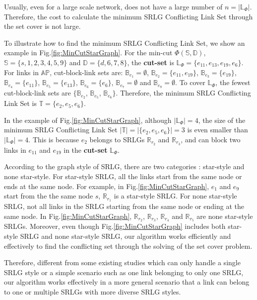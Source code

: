 Usually, even for a large scale network,  does not have a large number of $n=|\mathbb{L}_{\Phi}|$.  Therefore, the cost to calculate the minimum SRLG Conflicting Link Set through the set cover is not large.

To illustrate how to find the minimum SRLG Conflicting Link Set, we show an example in Fig.\ref{fig:MinCutStarGraph}. For the min-cut $\Phi(\mathbb{S},\mathbb{D})$, $\mathbb{S}=\{s, 1, 2, 3, 4, 5, 9\}$ and $\mathbb{D}=\{d, 6, 7, 8\}$, the \textbf{cut-set} is $\mathbb{L}_{\Phi}=\{e_{11},e_{13},e_{19},e_{6}\}$. For links in $\mathbb{AP}$,  cut-block-link sets are: $\mathbb{B}_{e_1}=\emptyset$, $\mathbb{B}_{e_2}=\{e_{11},e_{19}\}$, $\mathbb{B}_{e_3}=\{e_{19}\}$, $\mathbb{B}_{e_4}=\{e_{11}\}$, $\mathbb{B}_{e_5}=\{e_{13}\}$, $\mathbb{B}_{e_6}=\{e_6\}$, $\mathbb{B}_{e_7}=\emptyset$ and $\mathbb{B}_{e_8}=\emptyset$. To cover $\mathbb{L}_{\Phi}$, the fewest cut-block-link sets are $\{\mathbb{B}_{e_2}$, $\mathbb{B}_{e_5}$, $\mathbb{B}_{e_6}\}$. Therefore, the minimum SRLG Conflicting Link Set is $\mathbb{T}=\{e_2, e_5, e_6 \}$.

In the example of Fig.\ref{fig:MinCutStarGraph}, although $|\mathbb{L}_{\Phi}|=4$, the size of  the minimum SRLG Conflicting Link Set $|\mathbb{T}|=|\{e_2, e_5, e_6 \}|=3$ is even smaller than $|\mathbb{L}_{\Phi}|=4$. This is because $e_2$ belongs to   SRLGs $\mathbb{R}_{r_2}$ and $\mathbb{R}_{r_3}$, and can block two links in $e_{11}$ and  $e_{19}$ in the \textbf{cut-set} $\mathbb{L}_{\Phi}$.

According to the graph style of SRLG, there are two categories \cite{datta2008graph}:  star-style and none star-style. For star-style SRLG, all the links start from the same node or ends at the same node. For example, in Fig.\ref{fig:MinCutStarGraph}, $e_1$ and $e_9$ start from the  the same node $s$, $\mathbb{R}_{r_1}$ is a star-style SRLG.  For none star-style SRLG, not all links in the SRLG starting from the same node or ending at the same node. In Fig.\ref{fig:MinCutStarGraph}, $\mathbb{R}_{r_2}$, $\mathbb{R}_{r_3}$, $\mathbb{R}_{r_4}$ and $\mathbb{R}_{r_5}$ are none star-style SRLGs.
Moreover, even though Fig.\ref{fig:MinCutStarGraph} includes both  star-style SRLG  and none star-style SRLG,  our  algorithm works efficiently and effectively to find the conflicting set through the solving of the set cover problem.

Therefore, different from some existing studies \cite{datta2008graph} which can only handle a single SRLG style or a simple scenario such as  one link belonging to only one SRLG, our algorithm works effectively in a more  general scenario that a link can belong to one or multiple SRLGs with more diverse SRLG styles.


